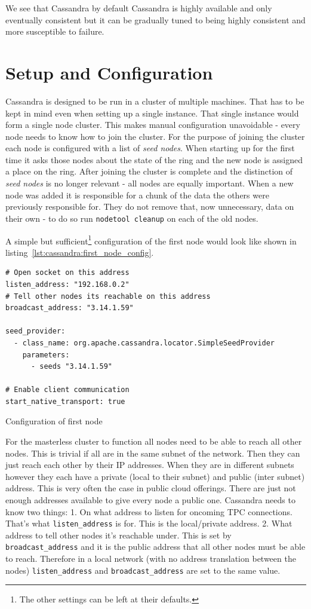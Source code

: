 We see that Cassandra by default Cassandra is highly available and only eventually consistent but it can be gradually tuned to being highly consistent and more susceptible to failure.

\section{Setup and Configuration}  %
Cassandra is designed to be run in a cluster of multiple machines. That has to be kept in mind even when setting up a single instance. That single instance would form a single node cluster. This makes manual configuration unavoidable - every node needs to know how to join the cluster.
For the purpose of joining the cluster each node is configured with a list of \textit{seed nodes}. When starting up for the first time it asks those nodes about the state of the ring and the new node is assigned a place on the ring. After joining the cluster is complete and the distinction of \textit{seed nodes} is no longer relevant - all nodes are equally important.
When a new node was added it is responsible for a chunk of the data the others were previously responsible for. They do not remove that, now unnecessary, data on their own - to do so run \texttt{nodetool cleanup} on each of the old nodes.

A simple but sufficient\footnote{The other settings can be left at their defaults.} configuration of the first node would look like shown in listing~\ref{lst:cassandra:first_node_config}.

\begin{listing}[ht]
  \begin{verbatim}
# Open socket on this address
listen_address: "192.168.0.2"
# Tell other nodes its reachable on this address
broadcast_address: "3.14.1.59"

seed_provider:
  - class_name: org.apache.cassandra.locator.SimpleSeedProvider
    parameters:
      - seeds "3.14.1.59"

# Enable client communication
start_native_transport: true
  \end{verbatim}
  \caption{Configuration of first node}
  \label{lst:cassandra:first_node_config}
\end{listing}

For the masterless cluster to function all nodes need to be able to reach all other nodes. This is trivial if all are in the same subnet of the network. Then they can just reach each other by their IP addresses.
When they are in different subnets however they each have a private (local to their subnet) and public (inter subnet) address. This is very often the case in public cloud offerings. There are just not enough addresses available to give every node a public one.
Cassandra needs to know two things:
1. On what address to listen for oncoming TPC connections. That's what \texttt{listen\_address} is for. This is the local/private address.
2. What address to tell other nodes it's reachable under. This is set by \texttt{broadcast\_address} and it is the public address that all other nodes must be able to reach.
Therefore in a local network (with no address translation between the nodes) \texttt{listen\_address} and \texttt{broadcast\_address} are set to the same value.

